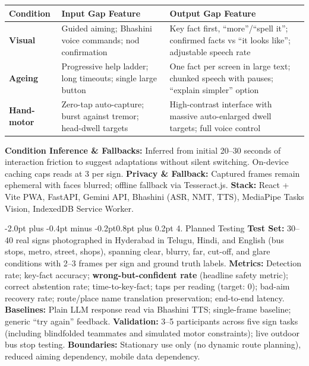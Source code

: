 \documentclass[10pt,a4paper]{article}
\makeatletter
\renewcommand{\section}{\@startsection{section}{1}{\z@}%
  {-2.0pt plus -0.4pt minus -0.2pt}{0.8pt plus 0.2pt}%
  {\normalfont\footnotesize\bfseries\scshape}}
\makeatother
\begin{document}
\vspace{-2pt}
\begin{center}
\scriptsize
\begin{tabular}{|l|p{5.8cm}|p{8.8cm}|}
\hline
\textbf{Condition} & \textbf{Input Gap Feature} & \textbf{Output Gap Feature} \\
\hline
\textbf{Visual} & Guided aiming; Bhashini voice commands; nod confirmation & Key fact first, ``more''/``spell it''; confirmed facts vs ``it looks like''; adjustable speech rate \\
\textbf{Ageing} & Progressive help ladder; long timeouts; single large button & One fact per screen in large text; chunked speech with pauses; ``explain simpler'' option \\
\textbf{Hand-motor} & Zero-tap auto-capture; burst against tremor; head-dwell targets & High-contrast interface with massive auto-enlarged dwell targets; full voice control \\
\hline
\end{tabular}
\end{center}
\vspace{-3pt}

\textbf{Condition Inference \& Fallbacks:} Inferred from initial 20--30 seconds of interaction friction to suggest adaptations without silent switching. On-device caching caps reads at 3 per sign. \textbf{Privacy \& Fallback:} Captured frames remain ephemeral with faces blurred; offline fallback via Tesseract.js. \textbf{Stack:} React + Vite PWA, FastAPI, Gemini API, Bhashini (ASR, NMT, TTS), MediaPipe Tasks Vision, IndexedDB Service Worker.

\vspace{-2pt}
\section{4. Planned Testing}
\textbf{Test Set:} 30--40 real signs photographed in Hyderabad in Telugu, Hindi, and English (bus stops, metro, street, shops), spanning clear, blurry, far, cut-off, and glare conditions with 2--3 frames per sign and ground truth labels. \quad
\textbf{Metrics:} Detection rate; key-fact accuracy; \textbf{wrong-but-confident rate} (headline safety metric); correct abstention rate; time-to-key-fact; taps per reading (target: 0); bad-aim recovery rate; route/place name translation preservation; end-to-end latency. \quad
\textbf{Baselines:} Plain LLM response read via Bhashini TTS; single-frame baseline; generic ``try again'' feedback. \quad
\textbf{Validation:} 3--5 participants across five sign tasks (including blindfolded teammates and simulated motor constraints); live outdoor bus stop testing. \quad
\textbf{Boundaries:} Stationary use only (no dynamic route planning), reduced aiming dependency, mobile data dependency.
\end{document}
